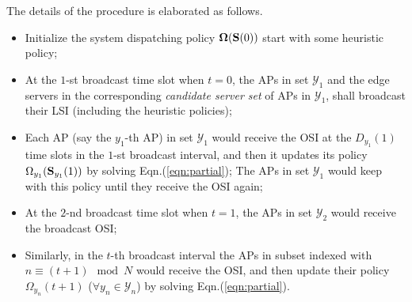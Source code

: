 The details of the procedure is elaborated as follows.
\begin{itemize}
    \item Initialize the system dispatching policy $\boldsymbol{\Omega}(\mathbf{S}(0))$ start with some heuristic policy;
    \item At the $1$-st broadcast time slot when $t=0$, the APs in set $\mathcal{Y}_{1}$ and the edge servers in the corresponding \emph{candidate server set} of APs in $\mathcal{Y}_{1}$, shall broadcast their LSI (including the heuristic policies);
    \item Each AP (say the $y_1$-th AP) in set $\mathcal{Y}_{1}$ would receive the OSI at the $D_{y_1}(1)$ time slots in the $1$-st broadcast interval, and then it updates its policy $\Omega_{y_1}(\mathbf{S}_{y_1}(1))$ by solving Eqn.(\ref{eqn:partial}); The APs in set $\mathcal{Y}_{1}$ would keep with this policy until they receive the OSI again;
    \item At the $2$-nd broadcast time slot when $t=1$, the APs in set $\mathcal{Y}_{2}$ would receive the  broadcast OSI;
    \item Similarly, in the $t$-th broadcast interval the APs in subset indexed with $n \equiv (t + 1)\mod{N}$ would receive the OSI, and then update their policy $\Omega_{y_n}(t+1)$ ($\forall y_n\in\mathcal{Y}_{n}$) by solving Eqn.(\ref{eqn:partial}).
\end{itemize}

    

